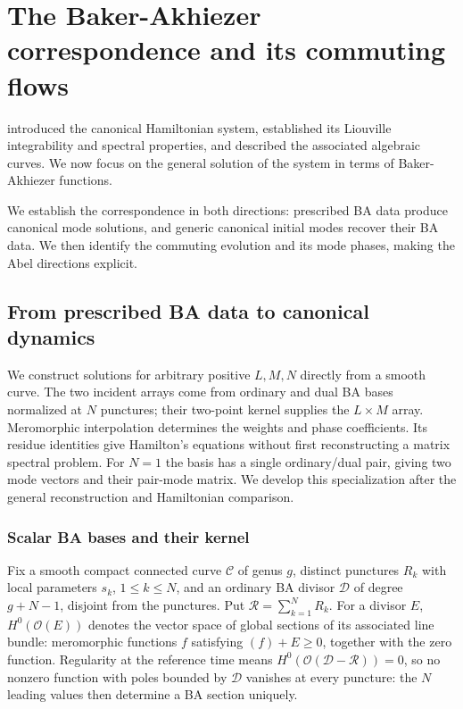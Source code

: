 \section{The Baker-Akhiezer correspondence and its commuting flows}
\label{sec:BA-correspondence}

 introduced the canonical Hamiltonian system,
established its Liouville integrability and spectral properties, and
described the associated algebraic curves. We now focus on the general
solution of the system in terms of Baker-Akhiezer functions.

We establish the correspondence in both directions: prescribed BA data
produce canonical mode solutions, and generic canonical initial modes
recover their BA data. We then identify the commuting evolution and
its mode phases, making the Abel directions explicit.

\subsection{From prescribed BA data to canonical dynamics}
\label{sec:general-BA-realization}

We construct solutions for arbitrary positive $L,M,N$ directly from a
smooth curve. The two incident arrays come from ordinary and dual BA
bases normalized at $N$ punctures; their two-point kernel supplies the
$L\times M$ array. Meromorphic interpolation determines the weights
and phase coefficients. Its residue identities give Hamilton's equations
without first reconstructing a matrix spectral problem.
For $N=1$ the basis has a single ordinary/dual pair, giving two
mode vectors and their pair-mode matrix. We develop this specialization
after the general reconstruction and Hamiltonian comparison.

\subsubsection{Scalar BA bases and their kernel}
\label{sec:multipoint-BA-data}

Fix a smooth compact connected curve $\mathcal C$ of genus $g$,
distinct punctures $R_k$ with local parameters $s_k$, $1\leq k\leq N$,
and an ordinary BA divisor $\mathscr D$ of degree $g+N-1$, disjoint
from the punctures. Put $\mathscr R=\sum_{k=1}^{N}R_k$.
For a divisor $E$, $H^0(\mathcal O(E))$ denotes the vector space of
global sections of its associated line bundle: meromorphic functions
$f$ satisfying $(f)+E\geq0$, together with the zero function.
Regularity at the reference time means
$H^0(\mathcal O(\mathscr D-\mathscr R))=0$, so no nonzero function
with poles bounded by $\mathscr D$ vanishes at every puncture: the $N$
leading values then determine a BA section uniquely.

